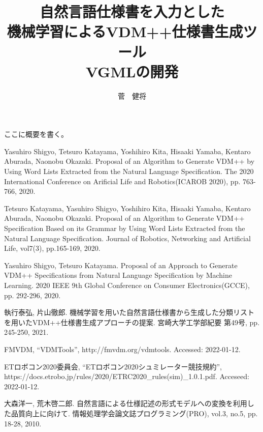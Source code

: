 \documentclass[uplatex, report, a4j, 10pt]{jsbook}
\title{自然言語仕様書を入力とした\\機械学習によるVDM++仕様書生成ツール\\VGMLの開発}
\author{菅　健将}
\begin{document}
\maketitle

%
% 
ここに概要を書く。


%
% 








%


%
\begin{thebibliography}{10}
	    
    Yasuhiro Shigyo, Tetsuro Katayama, Yoshihiro Kita, Hisaaki Yamaba, Kentaro Aburada, Naonobu Okazaki. 
    Proposal of an Algorithm to Generate VDM++ by Using Word Lists Extracted from the Natural Language Speciﬁcation. 
    The 2020 International Conference on Arificial Life and Robotics(ICAROB 2020), 
    pp. 763-766, 2020.
    
    Tetsuro Katayama, Yasuhiro Shigyo, Yoshihiro Kita, Hisaaki Yamaba, Kentaro Aburada, Naonobu Okazaki. 
    Proposal of an Algorithm to Generate VDM++ Speciﬁcation Based on its Grammar by Using Word Lists Extracted from the Natural Language Speciﬁcation. 
    Journal of Robotics, Networking and Artiﬁcial Life, vol7(3), pp.165-169, 2020.

     Yasuhiro Shigyo, Tetsuro Katayama. 
    Proposal of an Approach to Generate VDM++ Speciﬁcations from Natural Language Speciﬁcation by Machine Learning. 
    2020 IEEE 9th Global Conference on Consumer Electronics(GCCE), 
    pp. 292-296, 2020.

    執行泰弘, 片山徹郎. 
    機械学習を用いた自然言語仕様書から生成した分類リストを用いたVDM++仕様書生成アプローチの提案. 
    宮崎大学工学部紀要 第49号, 
    pp. 245-250, 2021.

    FMVDM, “VDMTools”, http:\slash \slash fmvdm.org\slash vdmtools. Accessed: 2022-01-12.

    ETロボコン2020委員会,  “ETロボコン2020シュミレーター競技規約”, https:\slash \slash docs.etrobo.jp\slash rules\slash 2020\slash ETRC2020\_rules(sim)\_1.0.1.pdf. Acceseed: 2022-01-12.

    大森洋一, 荒木啓二郎. 
    自然言語による仕様記述の形式モデルへの変換を利用した品質向上に向けて. 
    情報処理学会論文誌プログラミング(PRO), 
    vol.3, no.5, pp. 18-28, 2010.


\end{thebibliography}
\end{document}
